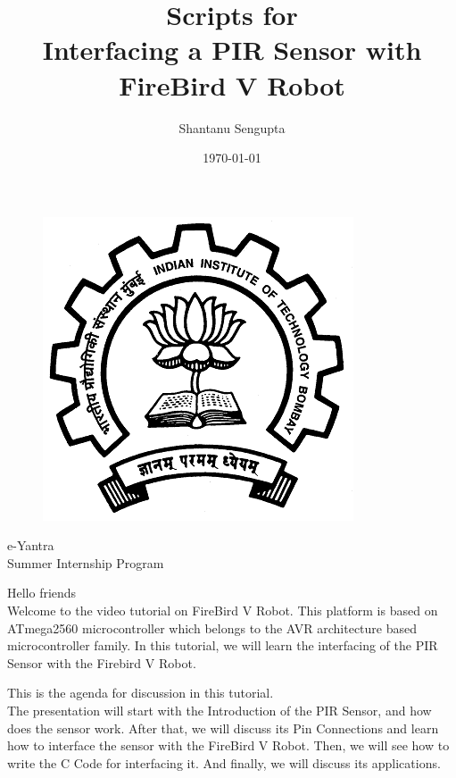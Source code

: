 \documentclass[a4paper,12 pt]{article}
\begin{document}
\begin{figure}[t]
\begin{center}
\includegraphics[]{iitb.png}
\end{center}
\end{figure}
\title{\textbf{Scripts for\\ Interfacing a PIR Sensor with FireBird V Robot}}
\author{Shantanu Sengupta}
\date{\today}
\maketitle

\begin{center}
\large e-Yantra \\ Summer Internship Program  
\end{center}
\vspace{100 in}
\pagebreak
\tableofcontents
\pagebreak


Hello friends\\
Welcome to the video tutorial on FireBird V Robot. This platform is based on ATmega2560 microcontroller which belongs to the AVR architecture based microcontroller family. In this tutorial, we will learn the interfacing of the PIR Sensor with the Firebird V Robot.

This is the agenda for discussion in this tutorial.\\
The presentation will start with the Introduction of the PIR Sensor, and how does the sensor work.
After that, we will discuss its Pin Connections and learn how to interface the sensor with the FireBird V Robot.
Then, we will see how to write the C Code for interfacing it.
And finally, we will discuss its applications.
\end{document}
